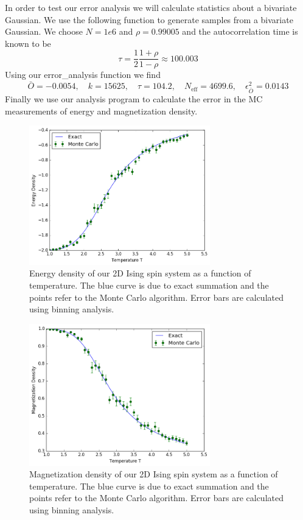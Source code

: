 In order to test our error analysis we will calculate statistics about a bivariate Gaussian. We use the following function to generate samples from a bivariate Gaussian.
We choose $N = 1e6$ and $\rho = 0.99005$ and the autocorrelation time is known to be
\begin{equation}
\tau = \frac{1}{2}\frac{1+\rho}{1-\rho} \approx 100.003
\end{equation}
Using our error\_analysis function we find
\begin{equation}
\bar{O}=-0.0054, \quad k = 15625, \quad \tau = 104.2, \quad N_\mathrm{eff} = 4699.6, \quad \epsilon^2_{\bar{O}} = 0.0143
\end{equation}
Finally we use our analysis program to calculate the error in the MC measurements of energy and magnetization density.
\begin{figure}[ht]
	\centering
	\includegraphics[width=0.7\textwidth]{../fig/errorplot_e.png}
	\caption{
		Energy density of our 2D Ising spin system as a function of temperature. The blue curve is due to exact summation and the points refer to the Monte Carlo algorithm. Error bars are calculated using binning analysis.}
	\label{fig:ising_e}
\end{figure}
\begin{figure}[ht]
	\centering
	\includegraphics[width=0.7\textwidth]{../fig/errorplot_m.png}
	\caption{
		Magnetization density of our 2D Ising spin system as a function of temperature. The blue curve is due to exact summation and the points refer to the Monte Carlo algorithm. Error bars are calculated using binning analysis.}
	\label{fig:ising_m}
\end{figure}